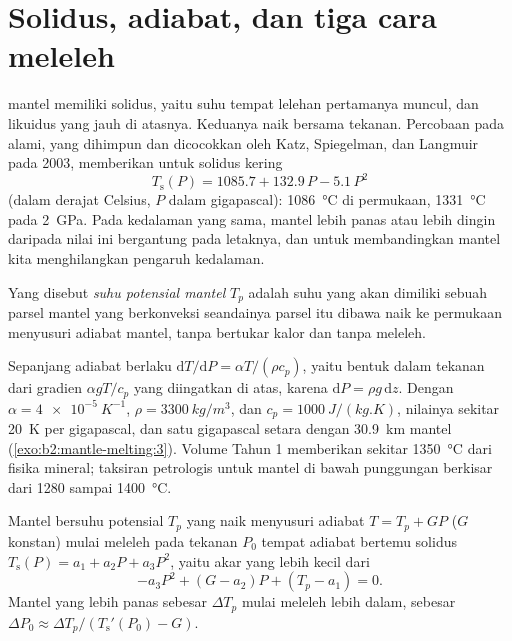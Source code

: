 \section{Solidus, adiabat, dan tiga cara meleleh}\label{sec:b2:mantle-melting:solidus}

 mantel memiliki solidus, yaitu suhu tempat lelehan pertamanya muncul,
dan likuidus yang jauh di atasnya. Keduanya naik bersama tekanan. Percobaan pada
 alami, yang dihimpun dan dicocokkan oleh Katz, Spiegelman, dan Langmuir pada 2003, memberikan
untuk solidus kering
\[
  T_{\mathrm{s}}(P) = 1085.7 + 132.9\,P - 5.1\,P^2
\]
(dalam derajat Celsius, $P$ dalam gigapascal): \qty{1086}{\celsius} di permukaan,
\qty{1331}{\celsius} pada \qty{2}{GPa}. Pada kedalaman yang sama, mantel lebih panas atau
lebih dingin daripada nilai ini bergantung pada letaknya, dan untuk membandingkan mantel kita menghilangkan
pengaruh kedalaman.

\begin{definition}\label{def:b2:mantle-melting:tp}
Yang disebut \emph{suhu potensial mantel} $T_p$
adalah suhu yang akan dimiliki sebuah parsel mantel yang berkonveksi seandainya parsel itu
dibawa naik ke permukaan menyusuri adiabat mantel, tanpa bertukar kalor dan
tanpa meleleh.
\end{definition}

Sepanjang adiabat berlaku $\mathrm dT/\mathrm dP = \alpha T/(\rho c_p)$, yaitu bentuk dalam
tekanan dari gradien $\alpha gT/c_p$ yang diingatkan di atas, karena $\mathrm dP = \rho
g\,\mathrm dz$. Dengan $\alpha = \qty{4e-5}{K^{-1}}$, $\rho = \qty{3300}{kg/m^3}$,
dan $c_p = \qty{1000}{J/(kg.K)}$, nilainya sekitar \qty{20}{K} per gigapascal, dan satu
gigapascal setara dengan \qty{30.9}{km} mantel (\cref{exo:b2:mantle-melting:3}). Volume Tahun 1 memberikan
 sekitar \qty{1350}{\celsius} dari fisika
mineral; taksiran petrologis untuk mantel di bawah punggungan berkisar dari 1280 sampai
\qty{1400}{\celsius}.

\begin{proposition}\label{prop:b2:mantle-melting:onset}
Mantel bersuhu potensial $T_p$ yang naik menyusuri adiabat $T = T_p + GP$ ($G$
konstan) mulai meleleh pada tekanan $P_0$ tempat adiabat bertemu
solidus $T_{\mathrm s}(P) = a_1 + a_2P + a_3P^2$, yaitu akar yang lebih kecil dari
\[
  -a_3P^2 + (G - a_2)P + (T_p - a_1) = 0 .
\]
Mantel yang lebih panas sebesar $\Delta T_p$ mulai meleleh lebih dalam, sebesar $\Delta P_0 \approx
\Delta T_p/(T_{\mathrm s}'(P_0) - G)$.
\end{proposition}

